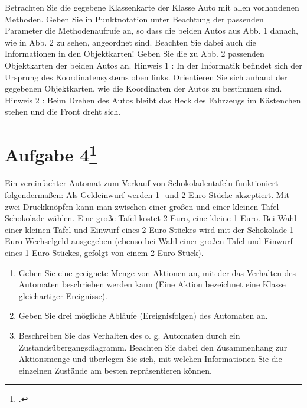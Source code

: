 \documentclass{lehramt-informatik}
\begin{document}
Betrachten Sie die gegebene Klassenkarte der Klasse Auto mit allen
vorhandenen Methoden. Geben Sie in Punktnotation unter Beachtung der
passenden Parameter die Methodenaufrufe an, so dass die beiden Autos aus
Abb. 1 danach, wie in Abb. 2 zu sehen, angeordnet sind. Beachten Sie
dabei auch die Informationen in den Objektkarten! Geben Sie die zu Abb.
2 passenden Objektkarten der beiden Autos an. Hinweis 1 : In der
Informatik befindet sich der Ursprung des Koordinatensystems oben links.
Orientieren Sie sich anhand der gegebenen Objektkarten, wie die
Koordinaten der Autos zu bestimmen sind. Hinweis 2 : Beim Drehen des
Autos bleibt das Heck des Fahrzeugs im Kästenchen stehen und die Front
dreht sich.

%

\section{Aufgabe 4\footcite{oomup:ab:1}}

Ein vereinfachter Automat zum Verkauf von Schokoladentafeln funktioniert
folgendermaßen: Als Geldeinwurf werden 1- und 2-Euro-Stücke akzeptiert.
Mit zwei Druckknöpfen kann man zwischen einer großen und einer kleinen
Tafel Schokolade wählen. Eine große Tafel kostet 2 Euro, eine kleine 1
Euro. Bei Wahl einer kleinen Tafel und Einwurf eines 2-Euro-Stückes wird
mit der Schokolade 1 Euro Wechselgeld ausgegeben (ebenso bei Wahl einer
großen Tafel und Einwurf eines 1-Euro-Stückes, gefolgt von einem
2-Euro-Stück).

\renewcommand{\labelenumi}{(\alph{enumi})}
\begin{enumerate}


\item Geben Sie eine geeignete Menge von Aktionen an, mit der das
Verhalten des Automaten beschrieben werden kann (Eine Aktion bezeichnet
eine Klasse gleichartiger Ereignisse).


\item Geben Sie drei mögliche Abläufe (Ereignisfolgen) des Automaten an.


\item Beschreiben Sie das Verhalten des o. g. Automaten durch ein
Zustandsübergangsdiagramm. Beachten Sie dabei den Zusammenhang zur
Aktionsmenge und überlegen Sie sich, mit welchen Informationen Sie die
einzelnen Zustände am besten repräsentieren können.

\end{enumerate}
\end{document}
